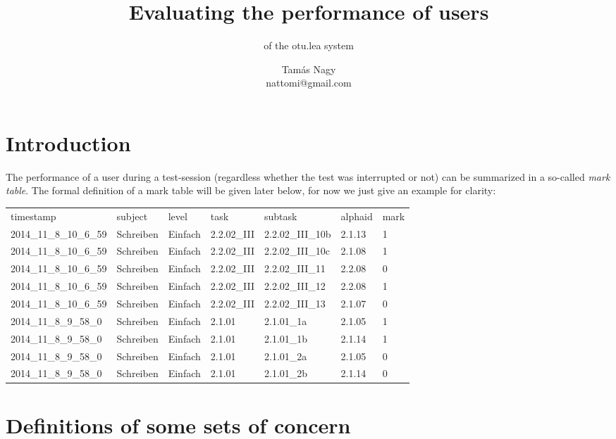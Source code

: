 \documentclass{scrartcl}
\title{Evaluating the performance of users}
\subtitle{of the otu.lea system}
\author{Tamás Nagy\\ \small nattomi@gmail.com}
\begin{document}
\maketitle
\section{Introduction}\label{sec:intro}
The performance of a user during a test-session (regardless whether the test was interrupted or not) can be summarized in a so-called \emph{mark table}. The formal definition of a mark table will be given later below, for now we just give an example for clarity:

\vspace{.5cm}
\begin{tabular}{lllllll}
timestamp	& subject	& level	& task	& subtask	& alphaid	& mark\\
2014\_11\_8\_10\_6\_59	& Schreiben	& Einfach	& 2.2.02\_III	& 2.2.02\_III\_10b	& 2.1.13	& 1\\
2014\_11\_8\_10\_6\_59	& Schreiben	& Einfach	& 2.2.02\_III	& 2.2.02\_III\_10c	& 2.1.08	& 1\\
2014\_11\_8\_10\_6\_59	& Schreiben	& Einfach	& 2.2.02\_III	& 2.2.02\_III\_11	& 2.2.08	& 0\\
2014\_11\_8\_10\_6\_59	& Schreiben	& Einfach	& 2.2.02\_III	& 2.2.02\_III\_12	& 2.2.08	& 1\\
2014\_11\_8\_10\_6\_59	& Schreiben	& Einfach	& 2.2.02\_III	& 2.2.02\_III\_13	& 2.1.07	& 0\\
2014\_11\_8\_9\_58\_0	& Schreiben	& Einfach	& 2.1.01	& 2.1.01\_1a	& 2.1.05	& 1\\
2014\_11\_8\_9\_58\_0	& Schreiben	& Einfach	& 2.1.01	& 2.1.01\_1b	& 2.1.14	& 1\\
2014\_11\_8\_9\_58\_0	& Schreiben	& Einfach	& 2.1.01	& 2.1.01\_2a	& 2.1.05	& 0\\
2014\_11\_8\_9\_58\_0	& Schreiben	& Einfach	& 2.1.01	& 2.1.01\_2b	& 2.1.14	& 0\\
\end{tabular}

\section{Definitions of some sets of concern}
\end{document}

